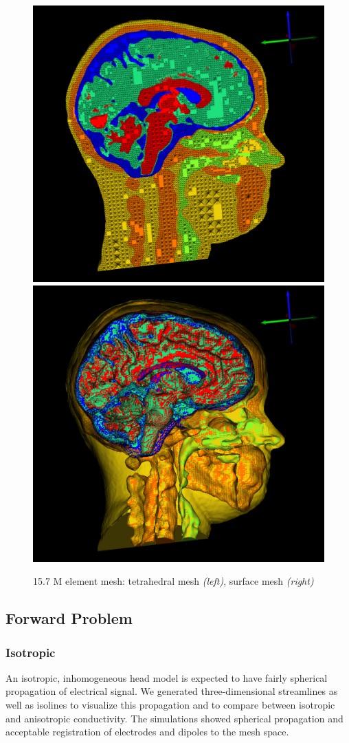 \begin{figure}[H]
\begin{center}
\includegraphics[width=.49\textwidth]{Figures/smallmesh_2}
\includegraphics[width=.49\textwidth]{Figures/smallmesh_surface}
\caption{15.7 M element mesh: tetrahedral mesh \textit{(left)}, surface mesh \textit{(right)}}
\label{fig:smallmesh}
\end{center}
\end{figure}

\subsection{Forward Problem}

\subsubsection{Isotropic}

An isotropic, inhomogeneous head model is expected to have fairly spherical propagation of electrical signal. We generated three-dimensional streamlines as well as isolines to visualize this propagation and to compare between isotropic and anisotropic conductivity. The simulations showed spherical propagation and acceptable registration of electrodes and dipoles to the mesh space.

